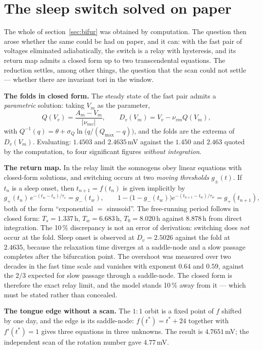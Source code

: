 \section{The sleep switch solved on paper}\label{sec:anal}
The whole of section~\ref{sec:bifur} was obtained by computation. The question then arose whether the same could be had on paper, and it can: with the fast pair of voltages eliminated adiabatically, the switch is a relay with hysteresis, and its return map admits a closed form up to two transcendental equations. The reduction settles, among other things, the question that the scan could not settle --- whether there are invariant tori in the window.

\textbf{The folds in closed form.} The steady state of the fast pair admits a \emph{parametric} solution: taking $V_m$ as the parameter,
\[Q(V_v)=\frac{A_m-V_m}{|\nu_{mv}|},\qquad D_v(V_m)=V_v-\nu_{vm}Q(V_m),\]
with $Q^{-1}(q)=\theta+\sigma_Q\ln\bigl(q/(Q_{\max}-q)\bigr)$, and the folds are the extrema of $D_v(V_m)$. Evaluating: $1.4503$ and $2.4635$\,mV against the $1.450$ and $2.463$ quoted by the computation, to four significant figures \emph{without integration}.

\textbf{The return map.} In the relay limit the somnogens obey linear equations with closed-form solutions, and switching occurs at two \emph{moving thresholds} $g_\pm(t)$. If $t_n$ is a sleep onset, then $t_{n+1}=f(t_n)$ is given implicitly by
\[g_+(t_n)\,e^{-(t_w-t_n)/\tau_s}=g_-(t_w),\qquad 1-\bigl(1-g_-(t_w)\bigr)e^{-(t_{n+1}-t_w)/\tau_w}=g_+(t_{n+1}),\]
both of the form ``exponential $=$ sinusoid''. The free-running period follows in closed form: $T_s=1.337$\,h, $T_w=6.683$\,h, $T_0=8.020$\,h against $8.878$\,h from direct integration. The 10\,\% discrepancy is not an error of derivation: switching does \emph{not} occur at the fold. Sleep onset is observed at $D_v=2.5026$ against the fold at $2.4635$, because the relaxation time diverges at a saddle-node and a slow passage completes after the bifurcation point. The overshoot was measured over two decades in the fast time scale and vanishes with exponent $0.64$ and $0.59$, against the $2/3$ expected for slow passage through a saddle-node. The closed form is therefore the exact relay limit, and the model stands 10\,\% away from it --- which must be stated rather than concealed.

\textbf{The tongue edge without a scan.} The $1{:}1$ orbit is a fixed point of $f$ shifted by one day, and the edge is its saddle-node: $f(t^*)=t^*+24$ together with $f'(t^*)=1$ gives three equations in three unknowns. The result is $4.7651$\,mV; the independent scan of the rotation number gave $4.77$\,mV.

